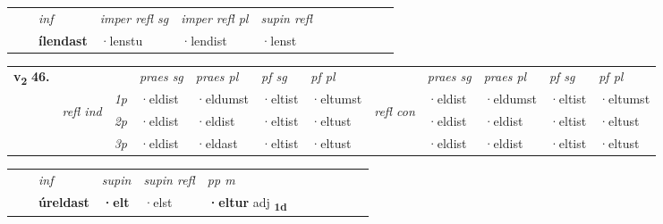 \begin{tabular}{llllllllllll}
 & & \textit{inf}   & \textit{imper refl sg} & \textit{imper refl pl}   & \textit{supin refl}      \\*
  & & \textbf{ílendast}    & ·lenstu & ·lendist   & ·lenst  \\*
\cmidrule{1-12}
\end{tabular}



\begin{tabular}{llllllllllll} \toprule
\multirow{4}{*}{{{\textbf{v{\textsubscript{2}}} \Large{\textbf{46.}}}}}  & &   &  \textit{praes sg}  & \textit{praes pl}  &\textit{pf sg} & \textit{pf pl} &  &  \textit{praes sg}  & \textit{praes pl}  & \textit{pf sg} & \textit{pf pl } \\*
	\cmidrule{4-7} \cmidrule{9-12}
 &\multirow{3}{*}{\begin{turn}{90}\textit{refl ind}\end{turn}} & {\textit{1p}} & ·eldist & ·eldumst    & ·eltist & ·eltumst & \multirow{3}{*}{\begin{turn}{90}\textit{refl con}\end{turn}}  &·eldist & ·eldumst & ·eltist & ·eltumst\\*
 &&  {\textit{2p}} &  ·eldist  & ·eldist   & ·eltist & ·eltust & &·eldist & ·eldist & ·eltist & ·eltust \\*
& &  {\textit{3p}} & ·eldist & ·eldast   & ·eltist & ·eltust & & ·eldist & ·eldist& ·eltist & ·eltust  \\*
\cmidrule{4-7} \cmidrule{9-12}
\end{tabular}


\begin{tabular}{llllllllllll}
 & & \textit{inf}      & \textit{supin} & \textit{supin refl} & \textit{pp m}     \\*
  & & \textbf{úreldast}       &  \textbf{·elt} & ·elst & \textbf{·eltur} adj \textbf{\textsubscript{1d}} \\*
\cmidrule{1-12}
\end{tabular}



